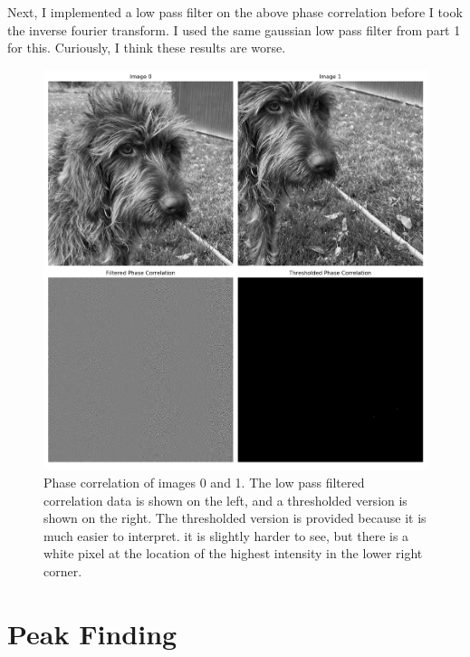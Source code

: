 \documentclass[]{article}
\begin{document}
Next, I implemented a low pass filter on the above phase correlation before I took the inverse fourier transform. I used the same gaussian low pass filter from part 1 for this. Curiously, I think these results are worse.
	\begin{figure}[H]
		\centering
		\includegraphics[width=6.5in]{p2_output/phase_correlation_low_pass.png}
		\caption{Phase correlation of images 0 and 1. The low pass filtered correlation data is shown on the left, and a thresholded version is shown on the right. The thresholded version is provided because it is much easier to interpret. it is slightly harder to see, but there is a white pixel at the location of the highest intensity in the lower right corner.}
	\end{figure}

\newpage
\section{Peak Finding}	
\end{document}
